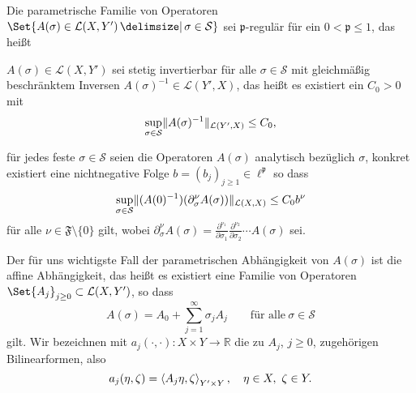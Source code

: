 \begin{Annahme}
    \label{thm:kunoth:assumption1}
    Die parametrische Familie von Operatoren
    $\Set{ A(\sigma) \in \mathcal L(X, Y') \given \sigma \in \mathcal S }$ sei $\mathfrak p$-regulär für ein $0 < \mathfrak p \leq 1$, das heißt
    \begin{thmenumerate}
        \item $A(\sigma) \in \mathcal L(X, Y')$ sei stetig invertierbar für alle $\sigma \in \mathcal S$ mit gleichmäßig beschränktem Inversen $A(\sigma)^{-1} \in \mathcal L(Y', X)$, das heißt es existiert ein $C_{0} > 0$ mit
        \begin{equation}
            \sup_{\sigma \in \mathcal S} \lVert A(\sigma)^{-1}\rVert_{\mathcal L(Y', X)} \leq C_{0},
        \end{equation}
        \item für jedes feste $\sigma \in \mathcal S$ seien die Operatoren $A(\sigma)$ analytisch bezüglich $\sigma$, konkret existiert eine nichtnegative Folge $b = (b_{j})_{j \geq 1} \in \ell^{\mathfrak p}$ so dass
        \begin{equation}
            \sup_{\sigma \in \mathcal S} \lVert(A(0)^{-1})(\partial^{\nu}_{\sigma} A(\sigma))\rVert_{\mathcal L(X, X)} \leq C_{0} b^{\nu}
        \end{equation}
        für alle $\nu \in \mathfrak F \setminus \{ 0 \}$ gilt, wobei $\partial^{\nu}_{\sigma} A(\sigma) = \frac{\partial^{\nu_{1}}}{\partial \sigma_{1}} \frac{\partial^{\nu_{2}}}{\partial \sigma_{2}} \cdots A(\sigma)$ sei.
    \end{thmenumerate}
\end{Annahme}

Der für uns wichtigste Fall der parametrischen Abhängigkeit von $A(\sigma)$ ist die affine Abhängigkeit, das heißt es existiert eine Familie von Operatoren $\Set{ A_{j} }_{j \geq 0} \subset \mathcal L(X, Y')$, so dass
\begin{equation}
    \label{eq:all_affiner_operator}
    A(\sigma) = A_{0} + \sum_{j = 1}^{\infty} \sigma_{j} A_{j} \qquad\text{für alle}~\sigma \in \mathcal S
\end{equation}
gilt.
Wir bezeichnen mit $a_{j}(\cdot, \cdot) \colon X \times Y \to \mathbb{R}$ die zu $A_{j}$, $j \geq 0$, zugehörigen Bilinearformen, also
\begin{equation}
    \label{eq:allg_affine_bf}
    a_{j}(\eta, \zeta) = \left\langle A_{j} \eta,\zeta\right\rangle_{Y' \times Y}, \quad \eta \in X,~\zeta \in Y.
\end{equation}

